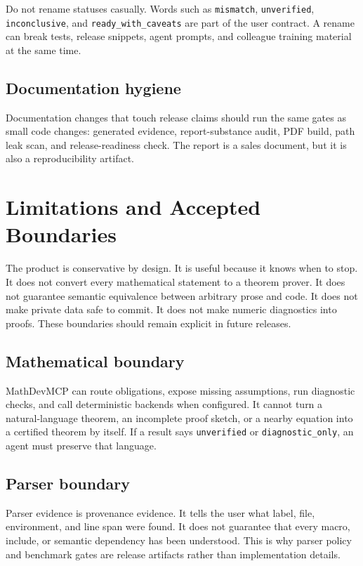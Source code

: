 \documentclass[12pt,a4paper,openany]{book}
\begin{document}
Do not rename statuses casually. Words such as \texttt{mismatch},
\texttt{unverified}, \texttt{inconclusive}, and \texttt{ready\_with\_caveats}
are part of the user contract. A rename can break tests, release snippets,
agent prompts, and colleague training material at the same time.

\section{Documentation hygiene}

Documentation changes that touch release claims should run the same gates as
small code changes: generated evidence, report-substance audit, PDF build, path
leak scan, and release-readiness check. The report is a sales document, but it
is also a reproducibility artifact.

\chapter{Limitations and Accepted Boundaries}

The product is conservative by design. It is useful because it knows when to
stop. It does not convert every mathematical statement to a theorem prover. It
does not guarantee semantic equivalence between arbitrary prose and code. It
does not make private data safe to commit. It does not make numeric diagnostics
into proofs. These boundaries should remain explicit in future releases.

\section{Mathematical boundary}

MathDevMCP can route obligations, expose missing assumptions, run diagnostic
checks, and call deterministic backends when configured. It cannot turn a
natural-language theorem, an incomplete proof sketch, or a nearby equation into
a certified theorem by itself. If a result says \texttt{unverified} or
\texttt{diagnostic\_only}, an agent must preserve that language.

\section{Parser boundary}

Parser evidence is provenance evidence. It tells the user what label, file,
environment, and line span were found. It does not guarantee that every macro,
include, or semantic dependency has been understood. This is why parser policy
and benchmark gates are release artifacts rather than implementation details.
\end{document}
